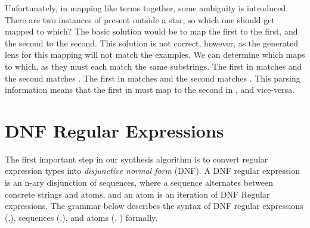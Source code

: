 \documentclass[numbers,10pt,preprint\ifanon ,nocopyrightspace\fi]{sigplanconf}
\begin{document}

Unfortunately, in mapping like terms together, some ambiguity is introduced.
There are two
instances of  present outside a star, so which one should get mapped to
which?  The basic solution would be to map the first to the first, and the
second to the second.  This solution is not correct, however, as the generated
lens for
this mapping will not match the examples.  We can determine which maps to which, as they
must each match the same substrings.  The first  in 
matches  and the second matches .  The first 
in  matches  and the second matches .
This parsing information means that the first  in  must map to the second
 in , and vice-versa.




\section{DNF Regular Expressions}
\label{sec:dnfre}


The first important step in our synthesis algorithm is to convert
regular expression types into \emph{disjunctive normal form} (DNF).
A DNF regular expression  is an n-ary disjunction of
sequences, where a sequence alternates between concrete strings and
atoms, and an atom is an iteration of DNF Regular expressions.
The grammar below describes the syntax of 
DNF regular expressions (\DNFRegex{},\DNFRegexAlt{}),
sequences (\Sequence{},\SequenceAlt{}), and atoms (\Atom, \AtomAlt)
formally.
\end{document}
